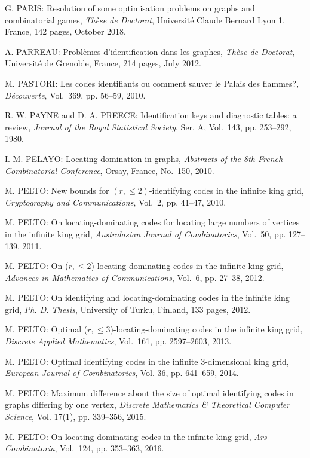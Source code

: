 \begin{thebibliography}{999}
G. PARIS: Resolution of some optimisation problems on graphs and combinatorial games, {\it Th\`ese de Doctorat}, Universit\'e Claude Bernard Lyon 1, France, 142 pages, October 2018.

A. PARREAU: Probl\`emes d'identification dans les graphes, {\it Th\`ese de Doctorat}, Universit\'e de Grenoble, France, 214 pages, July 2012.

M. PASTORI: Les codes identifiants ou comment sauver le Palais des flammes?, {\it D\'ecouverte}, Vol.~369, pp. 56--59, 2010.

R. W. PAYNE and D. A. PREECE: Identification keys and diagnostic tables: a review, {\it Journal of the Royal Statistical Society}, Ser. A, Vol.~143, pp. 253--292, 1980.

I. M. PELAYO: Locating domination in graphs, {\it Abstracts of the 8th French Combinatorial Conference}, Orsay, France, No.~150, 2010.

M. PELTO: New bounds for $(r,\leq 2)$-identifying codes in the infinite king grid, {\it Cryptography and Communications}, Vol.~2, pp. 41--47, 2010.

M. PELTO: On locating-dominating codes for locating large numbers of vertices in the infinite king grid, {\it Australasian Journal of Combinatorics}, Vol.~50, pp. 127--139, 2011.

M. PELTO: On ($r, \leq 2$)-locating-dominating codes in the infinite king grid, {\it Advances in Mathematics of Communications}, Vol.~6, pp. 27--38, 2012.

M. PELTO: On identifying and locating-dominating codes in the infinite king grid, {\it Ph. D. Thesis}, University of Turku, Finland, 133 pages, 2012.

M. PELTO: Optimal ($r, \leq 3$)-locating-dominating codes in the infinite king grid, {\it Discrete Applied Mathematics}, Vol.~161, pp. 2597--2603, 2013.

M. PELTO: Optimal identifying codes in the infinite $3$-dimensional king grid, {\it European Journal of Combinatorics}, Vol. 36, pp. 641--659, 2014.

M. PELTO: Maximum difference about the size of optimal identifying codes in graphs differing by one vertex, {\it Discrete Mathematics \& Theoretical Computer Science}, Vol. 17(1), pp. 339--356, 2015.

M. PELTO: On locating-dominating codes in the infinite king grid, {\it Ars Combinatoria}, Vol.~124, pp. 353--363, 2016.


\end{thebibliography}
